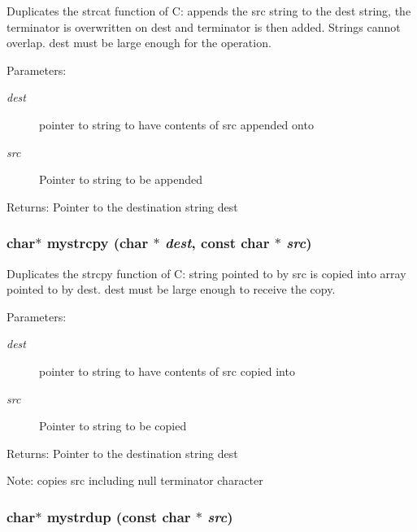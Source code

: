 Duplicates the strcat function of C: appends the src string to the dest string, the terminator is overwritten on dest and terminator is then added. Strings cannot overlap. dest must be large enough for the operation. \begin{Desc}
\item[Parameters:]
\begin{description}
\item[{\em dest}]pointer to string to have contents of src appended onto \item[{\em src}]Pointer to string to be appended \end{description}
\end{Desc}
\begin{Desc}
\item[Returns:]Pointer to the destination string dest \end{Desc}
\subsubsection{\setlength{\rightskip}{0pt plus 5cm}char$\ast$ mystrcpy (char $\ast$ {\em dest}, const char $\ast$ {\em src})}\label{mystring_8h_515b2c58f31e99a4564e463ffbf73e2f}


Duplicates the strcpy function of C: string pointed to by src is copied into array pointed to by dest. dest must be large enough to receive the copy. \begin{Desc}
\item[Parameters:]
\begin{description}
\item[{\em dest}]pointer to string to have contents of src copied into \item[{\em src}]Pointer to string to be copied \end{description}
\end{Desc}
\begin{Desc}
\item[Returns:]Pointer to the destination string dest \end{Desc}
\begin{Desc}
\item[Note:]copies src including null terminator character \end{Desc}
\subsubsection{\setlength{\rightskip}{0pt plus 5cm}char$\ast$ mystrdup (const char $\ast$ {\em src})}\label{mystring_8h_148a52c665d88f52fb4995338a319d3c}


